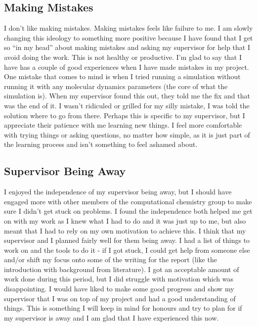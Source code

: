\documentclass[11pt]{article}
\begin{document}
\subsection{Making Mistakes}

I don't like making mistakes. Making mistakes feels like failure to me. I am slowly changing this ideology to something more positive because I have found that I get so ``in my head'' about making mistakes and asking my supervisor for help that I avoid doing the work. This is not healthy or productive. I'm glad to say that I have has a couple of good experiences when I have made mistakes in my project. One mistake that comes to mind is when I tried running a simulation without running it with any molecular dynamics parameters (the core of what the simulation is). When my supervisor found this out, they told me the fix and that was the end of it. I wasn't ridiculed or grilled for my silly mistake, I was told the solution where to go from there. Perhaps this is specific to my supervisor, but I appreciate their patience with me learning new things. I feel more comfortable with trying things or asking questions, no matter how simple, as it is just part of the learning process and isn't something to feel ashamed about.

\subsection{Supervisor Being Away}

I enjoyed the independence of my supervisor being away, but I should have engaged more with other members of the computational chemistry group to make sure I didn't get stuck on problems. I found the independence both helped me get on with my work as I knew what I had to do and it was just up to me, but also meant that I had to rely on my own motivation to achieve this. I think that my supervisor and I planned fairly well for them being away. I had a list of things to work on and the tools to do it - if I got stuck, I could get help from someone else and/or shift my focus onto some of the writing for the report (like the introduction with background from literature). I got an acceptable amount of work done during this period, but I did struggle with motivation which was disappointing. I would have liked to make some good progress and show my supervisor that I was on top of my project and had a good understanding of things. This is something I will keep in mind for honours and try to plan for if my supervisor is away and I am glad that I have experienced this now.
\end{document}

